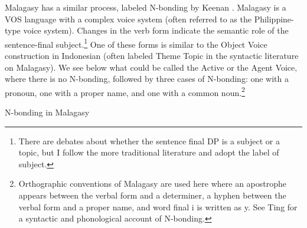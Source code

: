 \documentclass[output=paper,colorlinks,citecolor=brown,
]{langscibook}
\begin{document}
Malagasy has a similar process, labeled  N-bonding by Keenan \citeyearpar{Keenan:2000}.  Malagasy is a VOS language with a complex voice system (often referred to as the Philippine-type voice system).  Changes in the verb form indicate the semantic role of the sentence-final subject.\footnote{There are debates about whether the sentence final DP is a subject or a topic, but I follow the more traditional literature and adopt the label of subject.}  One of these forms is similar to the Object Voice construction in Indonesian (often labeled Theme Topic in the syntactic literature on Malagasy).  We see below what could be called the Active or the Agent Voice, where there is no N-bonding, followed by three cases of N-bonding: one with a pronoun, one with a proper name, and one with a common noun.\footnote{Orthographic conventions of Malagasy are used here where an apostrophe appears between the verbal form and a determiner, a hyphen between the verbal form and a proper name, and word final i is written as y. See Ting \citeyearpar{Ting:2021} for a syntactic and phonological account of N-bonding.}

\ea N-bonding in Malagasy
\z
\z
\end{document}
